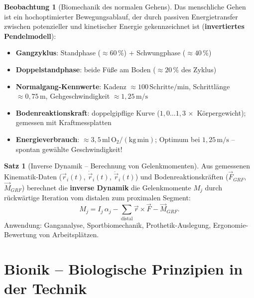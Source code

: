 ﻿\documentclass[a4paper,12pt]{report}
\theoremstyle{definition}
\newtheorem{satz}{Satz}
\newtheorem{beobachtung}{Beobachtung}
\begin{document}
\begin{beobachtung}[Biomechanik des normalen Gehens]
Das menschliche Gehen ist ein hochoptimierter Bewegungsablauf,
der durch passiven Energietransfer zwischen potenzieller und kinetischer
Energie gekennzeichnet ist (\textbf{invertiertes Pendelmodell}):
\begin{itemize}
    \item[-] \textbf{Gangzyklus}: Standphase ($\approx 60\,\%$) + Schwungphase ($\approx 40\,\%$)
    \item[-] \textbf{Doppelstandphase}: beide Füße am Boden ($\approx 20\,\%$ des Zyklus)
    \item[-] \textbf{Normalgang-Kennwerte}: Kadenz $\approx 100\,\mathrm{Schritte/min}$,
          Schrittlänge $\approx 0{,}75\,\mathrm{m}$, Gehgeschwindigkeit $\approx 1{,}25\,\mathrm{m/s}$
    \item[-] \textbf{Bodenreaktionskraft}: doppelgipflige Kurve ($1{,}0\ldots1{,}3\,\times$ Körpergewicht);
          gemessen mit Kraftmessplatten
    \item[-] \textbf{Energieverbrauch}: $\approx 3{,}5\,\mathrm{ml\,O_2/(kg\,min)}$;
          Optimum bei $1{,}25\,\mathrm{m/s}$ -- spontan gewählte Geschwindigkeit!
\end{itemize}
\end{beobachtung}

\begin{satz}[Inverse Dynamik -- Berechnung von Gelenkmomenten]
Aus gemessenen Kinematik-Daten ($\vec{r}_i(t)$, $\dot{\vec{r}}_i(t)$, $\ddot{\vec{r}}_i(t)$)
und Bodenreaktionskräften ($\vec{F}_{GRF}$, $\vec{M}_{GRF}$) berechnet die
\textbf{inverse Dynamik} die Gelenkmomente $M_j$ durch rückwärtige Iteration
vom distalen zum proximalen Segment:
\[
  M_j = I_j\,\alpha_j - \sum_{\text{distal}}\vec{r}\times\vec{F} - \vec{M}_{GRF}.
\]
Anwendung: Ganganalyse, Sportbiomechanik, Prothetik-Auslegung,
Ergonomie-Bewertung von Arbeitsplätzen.
\end{satz}

\section{Bionik -- Biologische Prinzipien in der Technik}
\end{document}
